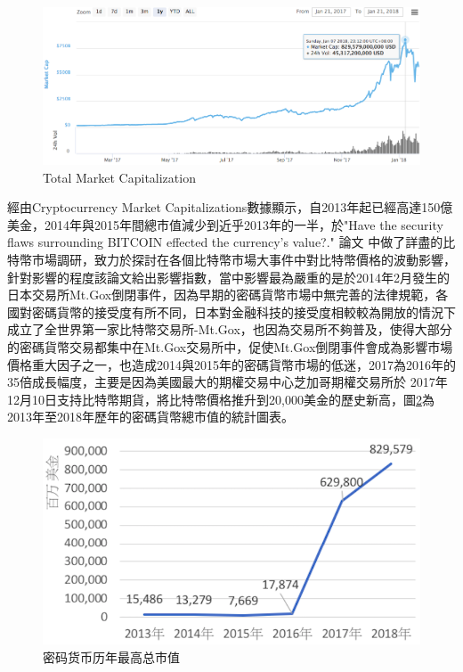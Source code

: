 		\begin{figure}[h]
			\centering
			\includegraphics[width = .9\textwidth]{TotalMarketCapitalization.png}
			\caption{Total Market Capitalization\supercite{CryptocurrencyMarketCapitalizations}}\label{TotalMarketCapitalization}
		\end{figure}

	經由Cryptocurrency Market Capitalizations數據顯示，自2013年起已經高達150億美金，2014年與2015年間總市值減少到近乎2013年的一半，於"Have the security flaws surrounding BITCOIN effected the currency's value?."
	論文\supercite{HavethesecurityflawssurroundingBITCOINeffectedthecurrencysvalue?}
	中做了詳盡的比特幣市場調研，致力於探討在各個比特幣市場大事件中對比特幣價格的波動影響，針對影響的程度該論文給出影響指數，當中影響最為嚴重的是於2014年2月發生的日本交易所Mt.Gox倒閉事件，因為早期的密碼貨幣市場中無完善的法律規範，各國對密碼貨幣的接受度有所不同，日本對金融科技的接受度相較較為開放的情況下成立了全世界第一家比特幣交易所-Mt.Gox，也因為交易所不夠普及，使得大部分的密碼貨幣交易都集中在Mt.Gox交易所中，促使Mt.Gox倒閉事件會成為影響市場價格重大因子之一，也造成2014與2015年的密碼貨幣市場的低迷，2017為2016年的35倍成長幅度，主要是因為美國最大的期權交易中心芝加哥期權交易所於	2017年12月10日支持比特幣期貨，將比特幣價格推升到20,000美金的歷史新高，圖\ref{Thetotalmarketcapitalization}為2013年至2018年歷年的密碼貨幣總市值的統計圖表。

		\begin{figure}[h]
			\centering
			\includegraphics[width = .7\textwidth]{Thetotalmarketcapitalization.png}
			\caption{密码货币历年最高总市值\supercite{CryptocurrencyMarketCapitalizations}}\label{Thetotalmarketcapitalization}
		\end{figure}
	


